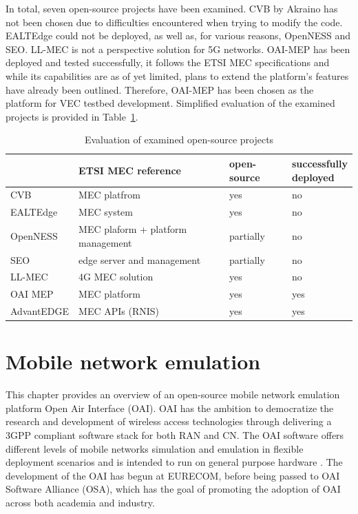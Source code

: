 \documentclass[12pt,a4paper,twoside]{report}
\begin{document}
In total, seven open-source projects have been examined. CVB by Akraino has not been chosen due to difficulties encountered when trying to modify the code. EALTEdge could not be deployed, as well as, for various reasons, OpenNESS and SEO. LL-MEC is not a perspective solution for 5G networks. OAI-MEP has been deployed and tested successfully, it follows the ETSI MEC specifications and while its capabilities are as of yet limited, plans to extend the platform’s features have already been outlined. Therefore, OAI-MEP has been chosen as the platform for VEC testbed development. Simplified evaluation of the examined projects is provided in Table~\ref{T:os-mec-proj}.
\begin{table}[!ht]
    \centering
	\caption{Evaluation of examined open-source projects}
	\label{T:os-mec-proj}
    \begin{tabular}{l|l|l|l}
    
        & ETSI MEC reference & open-source & \Longunderstack{successfully\\deployed} \\ \hline
        CVB & MEC platfrom & yes & no \\ \hline
        EALTEdge & MEC system & yes & no \\ \hline
        OpenNESS & MEC plaform + platform management & partially & no \\ \hline
        SEO & edge server and management & partially & no \\ \hline
        LL-MEC & 4G MEC solution & yes & no \\ \hline
        OAI MEP & MEC platform & yes & yes \\ \hline
        AdvantEDGE & MEC APIs (RNIS) & yes & yes \\ 
    \end{tabular}
\end{table}
\chapter{Mobile network emulation} %
\label{Ch:OAI}
This chapter provides an overview of an open-source mobile network emulation platform Open Air Interface (OAI). OAI has the ambition to democratize the research and development of wireless access technologies through delivering a 3GPP compliant software stack for both RAN and CN. The OAI software offers different levels of mobile networks simulation and emulation in flexible deployment scenarios and is intended to run on general purpose hardware \cite{kaltenberger-oai}. The development of the OAI has begun at EURECOM, before being passed to OAI Software Alliance (OSA), which has the goal of promoting the adoption of OAI across both academia and industry.
\end{document}
